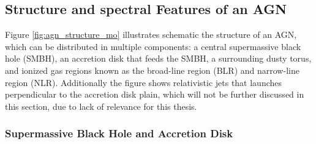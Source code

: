 \subsection{Structure and spectral Features of an AGN}
\label{sec:agn_structure}

Figure \ref{fig:agn_structure_mo} illustrates schematic the structure of an AGN, which can be distributed in multiple components: a central supermassive black hole (SMBH), an accretion disk that feeds the SMBH, a surrounding dusty torus, and ionized gas regions known as the broad-line region (BLR) and narrow-line region (NLR). Additionally the figure shows relativistic jets that launches perpendicular to the accretion disk plain, which will not be further discussed in this section, due to lack of relevance for this thesis.


\subsubsection{Supermassive Black Hole and Accretion Disk}


